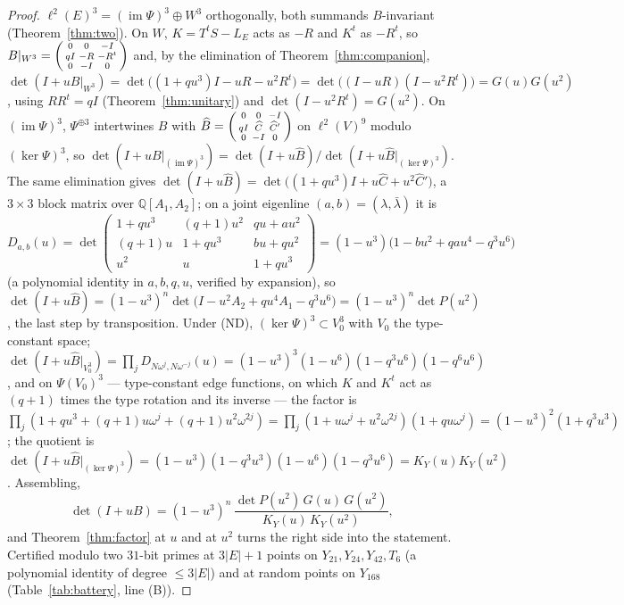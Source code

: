 \documentclass[11pt]{amsart}
\numberwithin{equation}{section}
\theoremstyle{definition}
\theoremstyle{remark}
\newcommand{\Q}{\mathbb{Q}}
\newcommand{\LE}{L_E}
\newcommand{\im}{\operatorname{im}}
\newcommand{\Ch}{\widehat C}
\newcommand{\Chp}{\widehat C{}'}
\newcommand{\Bh}{\widehat B}
\begin{document}
\begin{proof}
$\ell^{2}(E)^{3}=(\im\Psi)^{3}\oplus W^{3}$ orthogonally, both summands $B$-invariant
(Theorem~\ref{thm:two}). On $W$, $K=T^{t}S-\LE$ acts as $-R$ and $K^{t}$ as $-R^{t}$, so
$B|_{W^{3}}=\begin{psmallmatrix}0&0&-I\\qI&-R&-R^{t}\\0&-I&0\end{psmallmatrix}$ and, by the
elimination of Theorem~\ref{thm:companion},
$\det(I+uB|_{W^{3}})=\det\bigl((1+qu^{3})I-uR-u^{2}R^{t}\bigr)=\det\bigl((I-uR)(I-u^{2}R^{t})\bigr)
=G(u)G(u^{2})$, using $RR^{t}=qI$ (Theorem~\ref{thm:unitary}) and $\det(I-u^{2}R^{t})=G(u^{2})$.
On $(\im\Psi)^{3}$, $\Psi^{\oplus3}$ intertwines $B$ with
$\Bh=\begin{psmallmatrix}0&0&-I\\qI&\Ch&\Chp\\0&-I&0\end{psmallmatrix}$ on $\ell^{2}(V)^{9}$
modulo $(\ker\Psi)^{3}$, so $\det(I+uB|_{(\im\Psi)^{3}})=\det(I+u\Bh)/\det(I+u\Bh|_{(\ker\Psi)^{3}})$.
The same elimination gives $\det(I+u\Bh)=\det\bigl((1+qu^{3})I+u\Ch+u^{2}\Chp\bigr)$, a
$3\times3$ block matrix over $\Q[A_1,A_2]$; on a joint eigenline $(a,b)=(\lambda,\bar\lambda)$
it is
\[
D_{a,b}(u)=\det\begin{pmatrix}1+qu^{3}&(q{+}1)u^{2}&qu+au^{2}\\(q{+}1)u&1+qu^{3}&bu+qu^{2}\\u^{2}&u&1+qu^{3}\end{pmatrix}
=(1-u^{3})\bigl(1-bu^{2}+qau^{4}-q^{3}u^{6}\bigr)
\]
(a polynomial identity in $a,b,q,u$, verified by expansion), so
$\det(I+u\Bh)=(1-u^{3})^{n}\det\bigl(I-u^{2}A_2+qu^{4}A_1-q^{3}u^{6}\bigr)=(1-u^{3})^{n}\det P(u^{2})$,
the last step by transposition. Under (ND), $(\ker\Psi)^{3}\subset V_0^{3}$ with
$V_0$ the type-constant space; $\det(I+u\Bh|_{V_0^{3}})=\prod_jD_{N\omega^{j},N\omega^{-j}}(u)
=(1-u^{3})^{3}(1-u^{6})(1-q^{3}u^{6})(1-q^{6}u^{6})$, and on $\Psi(V_0)^{3}$ --- type-constant
edge functions, on which $K$ and $K^{t}$ act as $(q{+}1)$ times the type rotation and its
inverse --- the factor is $\prod_j(1+qu^{3}+(q{+}1)u\omega^{j}+(q{+}1)u^{2}\omega^{2j})
=\prod_j(1+u\omega^{j}+u^{2}\omega^{2j})(1+qu\omega^{j})=(1-u^{3})^{2}(1+q^{3}u^{3})$; the quotient is
$\det(I+u\Bh|_{(\ker\Psi)^{3}})=(1-u^{3})(1-q^{3}u^{3})(1-u^{6})(1-q^{3}u^{6})=K_Y(u)K_Y(u^{2})$.
Assembling,
\[
\det(I+uB)=(1-u^{3})^{n}\,\frac{\det P(u^{2})\,G(u)\,G(u^{2})}{K_Y(u)\,K_Y(u^{2})},
\]
and Theorem~\ref{thm:factor} at $u$ and at $u^{2}$ turns the right side into the statement.
Certified modulo two $31$-bit primes at $3|E|+1$ points on $Y_{21},Y_{24},Y_{42},T_6$ (a
polynomial identity of degree $\le3|E|$) and at random points on $Y_{168}$
(Table~\ref{tab:battery}, line (B)).
\end{proof}
\end{document}
